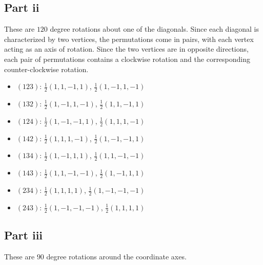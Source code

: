 \documentclass[letterpaper]{article}
\begin{document}
\subsection{Part ii}
\label{subs:1Partii}

These are $ 120 $ degree rotations about one of the diagonals.
Since each diagonal is characterized by two vertices, the permutations come in pairs, with each vertex acting as an axis of rotation.
Since the two vertices are in opposite directions, each pair of permutations contains a clockwise rotation and the corresponding counter-clockwise rotation.

\begin{itemize}
    \item $ (123) $: $ \frac{1}{2} (1, 1, -1, 1) $, $ \frac{1}{2} (1, -1, 1, -1) $

    \item $ (132) $: $ \frac{1}{2} (1, -1, 1, -1) $, $ \frac{1}{2} (1, 1, -1, 1) $

    \item $ (124) $: $ \frac{1}{2} (1, -1, -1, 1) $, $ \frac{1}{2} (1, 1, 1, -1) $

    \item $ (142) $: $ \frac{1}{2} (1, 1, 1, -1) $, $ \frac{1}{2} (1, -1, -1, 1) $

    \item $ (134) $: $ \frac{1}{2} (1, -1, 1, 1) $, $ \frac{1}{2} (1, 1, -1, -1) $

    \item $ (143) $: $ \frac{1}{2} (1, 1, -1, -1) $, $ \frac{1}{2} (1, -1, 1, 1) $

    \item $ (234) $: $ \frac{1}{2} (1, 1, 1, 1) $, $ \frac{1}{2} (1, -1, -1, -1) $

    \item $ (243) $: $ \frac{1}{2} (1, -1, -1, -1) $, $ \frac{1}{2} (1, 1, 1, 1) $
\end{itemize}



\subsection{Part iii}
\label{subs:1Partiii}

These are $ 90 $ degree rotations around the coordinate axes.
\end{document}
